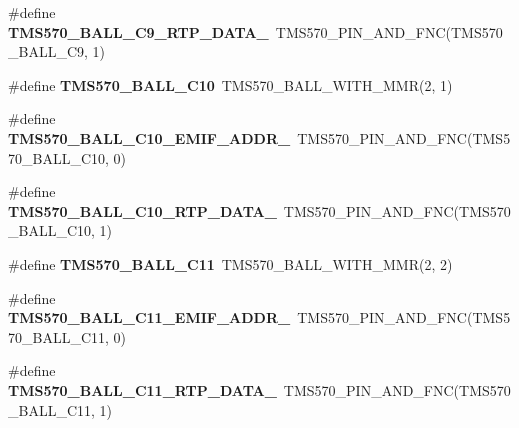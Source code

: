 \begin{DoxyCompactItemize}
\mbox{\label{tms570lc4357-pins_8h_a10f27bdb1c42629ceda5c0f5ce21fc63}} 
\#define {\bfseries T\+M\+S570\+\_\+\+B\+A\+L\+L\+\_\+\+C9\+\_\+\+R\+T\+P\+\_\+\+D\+A\+T\+A\+\_}~T\+M\+S570\+\_\+\+P\+I\+N\+\_\+\+A\+N\+D\+\_\+\+F\+NC(T\+M\+S570\+\_\+\+B\+A\+L\+L\+\_\+\+C9, 1)
\item 
\mbox{\label{tms570lc4357-pins_8h_a6a5bae7c0506088cb1d3a484e8f5ad7b}} 
\#define {\bfseries T\+M\+S570\+\_\+\+B\+A\+L\+L\+\_\+\+C10}~T\+M\+S570\+\_\+\+B\+A\+L\+L\+\_\+\+W\+I\+T\+H\+\_\+\+M\+MR(2, 1)
\item 
\mbox{\label{tms570lc4357-pins_8h_a712e40ba4ffa418e88c0d1fc4ee0580f}} 
\#define {\bfseries T\+M\+S570\+\_\+\+B\+A\+L\+L\+\_\+\+C10\+\_\+\+E\+M\+I\+F\+\_\+\+A\+D\+D\+R\+\_}~T\+M\+S570\+\_\+\+P\+I\+N\+\_\+\+A\+N\+D\+\_\+\+F\+NC(T\+M\+S570\+\_\+\+B\+A\+L\+L\+\_\+\+C10, 0)
\item 
\mbox{\label{tms570lc4357-pins_8h_af3503ff8899a3c8e5084845d23c3a329}} 
\#define {\bfseries T\+M\+S570\+\_\+\+B\+A\+L\+L\+\_\+\+C10\+\_\+\+R\+T\+P\+\_\+\+D\+A\+T\+A\+\_}~T\+M\+S570\+\_\+\+P\+I\+N\+\_\+\+A\+N\+D\+\_\+\+F\+NC(T\+M\+S570\+\_\+\+B\+A\+L\+L\+\_\+\+C10, 1)
\item 
\mbox{\label{tms570lc4357-pins_8h_acf7724683b6767fa0009bee27d2a28c1}} 
\#define {\bfseries T\+M\+S570\+\_\+\+B\+A\+L\+L\+\_\+\+C11}~T\+M\+S570\+\_\+\+B\+A\+L\+L\+\_\+\+W\+I\+T\+H\+\_\+\+M\+MR(2, 2)
\item 
\mbox{\label{tms570lc4357-pins_8h_a68af8a8d173b37d119594c211d2e83d3}} 
\#define {\bfseries T\+M\+S570\+\_\+\+B\+A\+L\+L\+\_\+\+C11\+\_\+\+E\+M\+I\+F\+\_\+\+A\+D\+D\+R\+\_}~T\+M\+S570\+\_\+\+P\+I\+N\+\_\+\+A\+N\+D\+\_\+\+F\+NC(T\+M\+S570\+\_\+\+B\+A\+L\+L\+\_\+\+C11, 0)
\item 
\mbox{\label{tms570lc4357-pins_8h_ab2abd75074a374446aa08c72b70ac46c}} 
\#define {\bfseries T\+M\+S570\+\_\+\+B\+A\+L\+L\+\_\+\+C11\+\_\+\+R\+T\+P\+\_\+\+D\+A\+T\+A\+\_}~T\+M\+S570\+\_\+\+P\+I\+N\+\_\+\+A\+N\+D\+\_\+\+F\+NC(T\+M\+S570\+\_\+\+B\+A\+L\+L\+\_\+\+C11, 1)
\item 
\mbox{\label{tms570lc4357-pins_8h_a02aa4b1103f1f9c11864a2f36c1680f4}} 

\end{DoxyCompactItemize}
